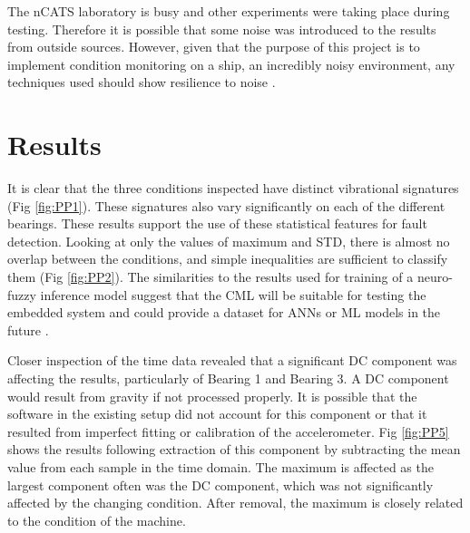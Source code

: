 The nCATS laboratory is busy and other experiments were taking place during testing. 
Therefore it is possible that some noise was introduced to the results from outside sources. 
However, given that the purpose of this project is to implement condition monitoring on a ship, an incredibly noisy environment, any techniques used should show resilience to noise \cite{CBM_lr}.

\section{Results}

It is clear that the three conditions inspected have distinct vibrational signatures (Fig \ref{fig:PP1}).
These signatures also vary significantly on each of the different bearings. 
These results support the use of these statistical features for fault detection.
Looking at only the values of maximum and STD, there is almost no overlap between the conditions, and simple inequalities are sufficient to classify them (Fig \ref{fig:PP2}).
The similarities to the results used for training of a neuro-fuzzy inference model suggest that the CML will be suitable for testing the embedded system and could provide a dataset for ANNs or ML models in the future \cite{VIB_moosavian}.
\par

Closer inspection of the time data revealed that a significant DC component was affecting the results, particularly of Bearing 1 and Bearing 3.
A DC component would result from gravity if not processed properly.
It is possible that the software in the existing setup did not account for this component or that it resulted from imperfect fitting or calibration of the accelerometer.
Fig \ref{fig:PP5} shows the results following extraction of this component by subtracting the mean value from each sample in the time domain.
The maximum is affected as the largest component often was the DC component, which was not significantly affected by the changing condition.
After removal, the maximum is closely related to the condition of the machine.
\par

